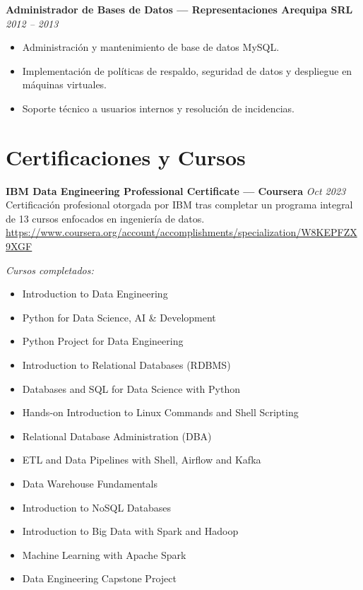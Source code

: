 \documentclass[a4paper,10pt]{article}
\begin{document}
\vspace{5pt}

\textbf{Administrador de Bases de Datos — Representaciones Arequipa SRL} \hfill \textit{2012 – 2013} \\
\begin{itemize}[leftmargin=*]
    \item Administración y mantenimiento de base de datos MySQL.
    \item Implementación de políticas de respaldo, seguridad de datos y despliegue en máquinas virtuales.
    \item Soporte técnico a usuarios internos y resolución de incidencias.
\end{itemize}

\vspace{10pt}

\section*{Certificaciones y Cursos}

\textbf{IBM Data Engineering Professional Certificate — Coursera} \hfill \textit{Oct 2023} \\
Certificación profesional otorgada por IBM tras completar un programa integral de 13 cursos enfocados en ingeniería de datos. \\
\url{https://www.coursera.org/account/accomplishments/specialization/W8KEPFZX9XGF}

\vspace{2pt}

\textit{Cursos completados:}
\begin{itemize}
  \item Introduction to Data Engineering
  \item Python for Data Science, AI & Development
  \item Python Project for Data Engineering
  \item Introduction to Relational Databases (RDBMS)
  \item Databases and SQL for Data Science with Python
  \item Hands-on Introduction to Linux Commands and Shell Scripting
  \item Relational Database Administration (DBA)
  \item ETL and Data Pipelines with Shell, Airflow and Kafka
  \item Data Warehouse Fundamentals
  \item Introduction to NoSQL Databases
  \item Introduction to Big Data with Spark and Hadoop
  \item Machine Learning with Apache Spark
  \item Data Engineering Capstone Project
\end{itemize}
\end{document}
